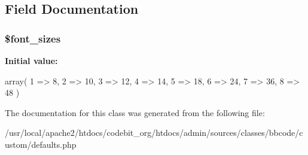 \subsection{Field Documentation}
\hypertarget{classbbcode__size_a845a42b93daaa865d0645e04b840ab2d}{
\subsubsection[{\$font\-\_\-sizes}]{\setlength{\rightskip}{0pt plus 5cm}\$font\-\_\-sizes\hspace{0.3cm}{\ttfamily [protected]}}}\label{classbbcode__size_a845a42b93daaa865d0645e04b840ab2d}
{\bfseries Initial value\-:}
\begin{DoxyCode}
 array( 1 => 8,
                                                                           2 =>
       10,
                                                                           3 =>
       12,
                                                                           4 =>
       14,
                                                                           5 =>
       18,
                                                                           6 =>
       24,
                                                                           7 =>
       36,
                                                                           8 =>
       48 )
\end{DoxyCode}


The documentation for this class was generated from the following file\-:\begin{DoxyCompactItemize}
\item 
/usr/local/apache2/htdocs/codebit\-\_\-org/htdocs/admin/sources/classes/bbcode/custom/defaults.\-php\end{DoxyCompactItemize}
